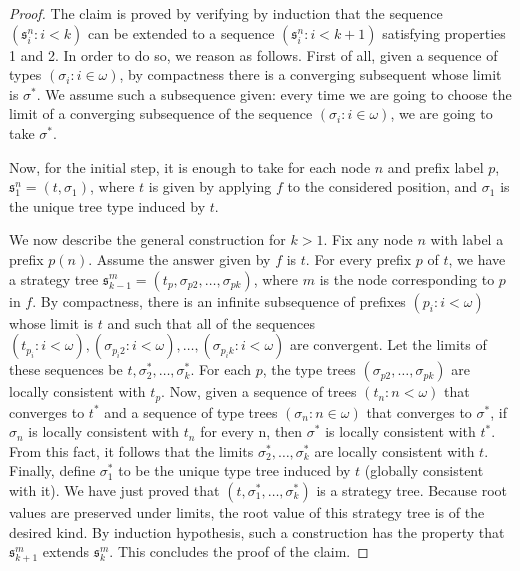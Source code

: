\begin{proof}
The claim  is proved by verifying by induction that the sequence $(\mathfrak{s}^n_i: i < k)$ can be extended to a sequence $(\mathfrak{s}^n_i: i < k+1)$ satisfying properties 1 and 2. 
In order to do so, we reason as follows. First of all, given a sequence of types $(\sigma_i : i \in \omega)$, by compactness there is a converging subsequent whose limit is  $\sigma^*$. We assume such a subsequence given: every time we are going to choose the limit of a converging  subsequence of the sequence $(\sigma_i : i \in \omega)$, we are going to take $\sigma^*$.

Now, for the initial step, it is enough to take for each node $n$ and prefix label $p$, $\mathfrak{s}^n_1=(t, \sigma_1)$, where $t$ is given by applying $f$ to the considered position, and $\sigma_1$ is the unique tree type induced by $t$. 

We now describe the general construction for $k>1$. Fix any node $n$ with label a prefix $p(n)$. Assume the answer given by $f$ is $t$. For every prefix $p$ of $t$, we have a strategy tree $\mathfrak{s}^m_{k-1}=(t_p, \sigma_{p2}, \dots, \sigma_{pk})$, where $m$ is the node corresponding to $p$ in $f$. 
By compactness, there is an infinite subsequence of prefixes $(p_i: i < \omega)$ whose limit is $t$ and such that all of the sequences
$(t_{p_i}: i <\omega ), (\sigma_{p_i2}: i <\omega ), \dots,  (\sigma_{p_ik}: i <\omega )$ are convergent. Let the limits of these sequences be $t, \sigma^*_2, \dots, \sigma^*_k$.
For each $p$, the type trees $(\sigma_{p2}, \dots, \sigma_{pk})$
are locally consistent with $t_p$. Now, given a sequence of trees $(t_n: n <\omega)$  that converges to $t^*$ and a sequence of type trees $(\sigma_n: n \in \omega)$  that converges to $\sigma^*$, if $\sigma_n$ is locally consistent with $t_n$ for every n, then $\sigma^*$ is locally consistent with $t^*$.
From this fact, it follows that the limits $\sigma^*_2, \dots, \sigma^*_k$ are locally consistent with $t$. Finally, define $\sigma^*_1$ to be the unique type tree induced by  $t$ (globally consistent with it). We have just proved that
$(t, \sigma^*_1, \dots, \sigma^*_k)$
is a strategy tree. Because root values are preserved under limits, the root value
of this strategy tree is of the desired kind. By induction hypothesis, such a construction has the property that $\mathfrak{s}^m_{k+1}$ extends $\mathfrak{s}^m_{k}$. This concludes the proof of the claim.
 \end{proof}
 
